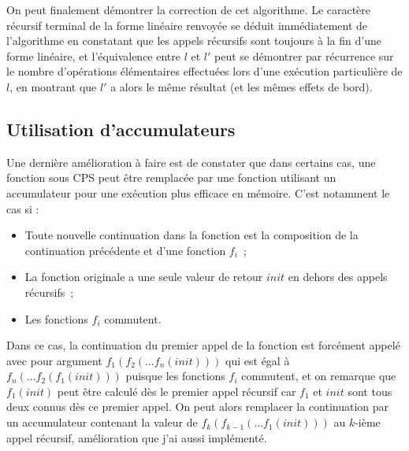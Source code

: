 On peut finalement démontrer la correction de cet algorithme. Le caractère
récursif terminal de la forme linéaire renvoyée se déduit immédiatement de
l'algorithme en constatant que les appels récursifs sont toujours à la fin d'une
forme linéaire, et l'équivalence entre $l$ et $l'$ peut se démontrer par
récurrence sur le nombre d'opérations élémentaires effectuées lors d'une
exécution particulière de $l$, en montrant que $l'$ a alors le même résultat (et
les mêmes effets de bord).

\subsection{Utilisation d'accumulateurs}

Une dernière amélioration à faire est de constater que dans certains cas, une
fonction sous CPS peut être remplacée par une fonction utilisant un accumulateur
pour une exécution plus efficace en mémoire. C'est notamment le cas si :
\begin{itemize}
    \item Toute nouvelle continuation dans la fonction est la composition de la
          continuation précédente et d'une fonction $f_i$~;
    \item La fonction originale a une seule valeur de retour $init$ en dehors
          des appels récursifs~;
    \item Les fonctions $f_i$ commutent.
\end{itemize}

Dans ce cas, la continuation du premier appel de la fonction est forcément
appelé avec pour argument $f_1(f_2(\ldots f_n(init)))$ qui est égal à
$f_n(\ldots f_2(f_1(init)))$ puisque les fonctions $f_i$ commutent, et on
remarque que $f_1(init)$ peut être calculé dès le premier appel récursif car
$f_1$ et $init$ sont tous deux connus dès ce premier appel. On peut alors
remplacer la continuation par un accumulateur contenant la valeur de
$f_k(f_{k-1}(\ldots f_1(init)))$ au $k$-ième appel récursif, amélioration que
j'ai aussi implémenté.
